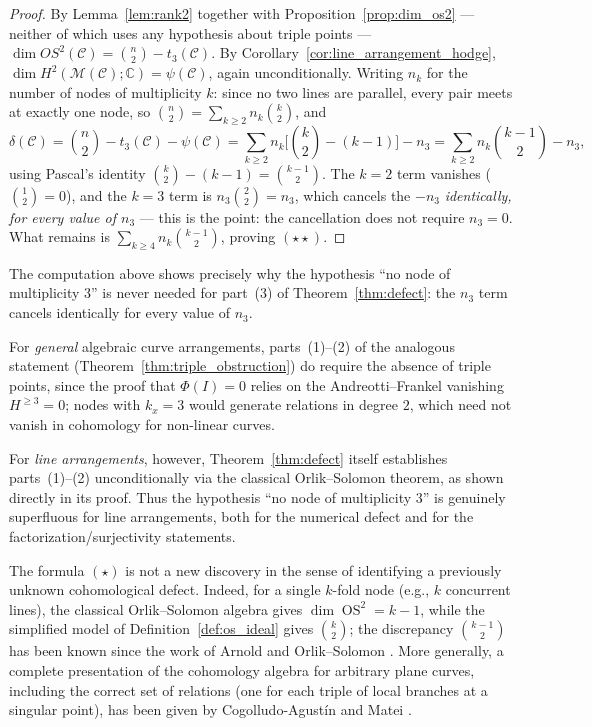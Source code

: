 \documentclass[article,11pt]{amsart} \numberwithin{equation}{section}
\numberwithin{equation}{section}
\begin{document}
{\begin{proof}
	By Lemma~\ref{lem:rank2} together with Proposition~\ref{prop:dim_os2} --- neither of which uses any
	hypothesis about triple points --- $\dim OS^2(\mathcal C)=\binom n2-t_3(\mathcal C)$.
	By Corollary~\ref{cor:line_arrangement_hodge}, $\dim H^2(\mathcal M(\mathcal C);\mathbb C)=\psi(\mathcal C)$,
	again unconditionally. Writing $n_k$ for the number of nodes of multiplicity
	$k$: since no two lines are parallel, every pair meets at exactly one node,
	so $\binom n2=\sum_{k\ge2}n_k\binom k2$, and
	\[
	\delta(\mathcal C)=\binom n2-t_3(\mathcal C)-\psi(\mathcal C)
	=\sum_{k\ge2}n_k\Big[\binom k2-(k-1)\Big]-n_3
	=\sum_{k\ge2}n_k\binom{k-1}{2}-n_3,
	\]
	using Pascal's identity $\binom k2-(k-1)=\binom{k-1}2$. The $k=2$ term
	vanishes ($\binom12=0$), and the $k=3$ term is $n_3\binom22=n_3$, which
	cancels the $-n_3$ \emph{identically, for every value of $n_3$} --- this is
	the point: the cancellation does not require $n_3=0$. What remains is
	$\sum_{k\ge4}n_k\binom{k-1}2$, proving $(\star\star)$.
\end{proof}

\begin{rk}
	\label{rmk:defect_hypothesis}
	The computation above shows precisely why the hypothesis ``no node of multiplicity $3$'' is never needed for part~(3) of Theorem~\ref{thm:defect}: the $n_3$ term cancels identically for every value of $n_3$.
	
	For \emph{general} algebraic curve arrangements, parts~(1)--(2) of the analogous statement (Theorem~\ref{thm:triple_obstruction}) do require the absence of triple points, since the proof that $\Phi(I)=0$ relies on the Andreotti--Frankel vanishing $H^{\ge3}=0$; nodes with $k_x=3$ would generate relations in degree $2$, which need not vanish in cohomology for non-linear curves.
	
	For \emph{line arrangements}, however, Theorem~\ref{thm:defect} itself establishes parts~(1)--(2) unconditionally via the classical Orlik--Solomon theorem, as shown directly in its proof. Thus the hypothesis ``no node of multiplicity $3$'' is genuinely superfluous for line arrangements, both for the numerical defect and for the factorization/surjectivity statements.
\end{rk}

\begin{rk}
	\label{rem:defect_scope}
	The formula $(\star)$ is not a new discovery in the sense of identifying a previously
	unknown cohomological defect. Indeed, for a single $k$-fold node (e.g., $k$ concurrent
	lines), the classical Orlik--Solomon algebra gives $\dim \operatorname{OS}^2 = k-1$, while
	the simplified model of Definition~\ref{def:os_ideal} gives $\binom{k}{2}$; the discrepancy
	$\binom{k-1}{2}$ has been known since the work of Arnold \cite{Arnold69} and Orlik--Solomon
	\cite{OrlikSolomon}. More generally, a complete presentation of the cohomology algebra
	for arbitrary plane curves, including the correct set of relations (one for each triple of
	local branches at a singular point), has been given by Cogolludo-Agust\'in and Matei
	\cite{CogolludoMatei2012}.
	

\end{rk}}
\end{document}

